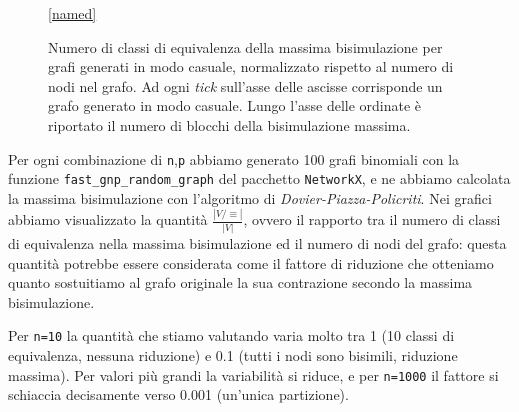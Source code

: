 \begin{figure}[t!]
\begin{center}
\begin{subfigure}[b]{0.3\textwidth}
        \end{subfigure}
        \ref*{named}
    \end{center}
    \caption{Numero di classi di equivalenza della massima bisimulazione per grafi generati in modo casuale, normalizzato rispetto al numero di nodi nel grafo. Ad ogni \emph{tick} sull'asse delle ascisse corrisponde un grafo generato in modo casuale. Lungo l'asse delle ordinate è riportato il numero di blocchi della bisimulazione massima.}
    \label{fig:bisi_size}
\end{figure}

Per ogni combinazione di \verb|n|,\verb|p| abbiamo generato 100 grafi binomiali con la funzione \verb|fast_gnp_random_graph| del pacchetto \texttt{NetworkX}, e ne abbiamo calcolata la massima bisimulazione con l'algoritmo di \emph{Dovier-Piazza-Policriti}. Nei grafici abbiamo visualizzato la quantità $\frac{|V / \equiv|}{|V|}$, ovvero il rapporto tra il numero di classi di equivalenza nella massima bisimulazione ed il numero di nodi del grafo: questa quantità potrebbe essere considerata come il fattore di riduzione che otteniamo quanto sostuitiamo al grafo originale la sua contrazione secondo la massima bisimulazione.

Per \verb|n=10| la quantità che stiamo valutando varia molto tra 1 (10 classi di equivalenza, nessuna riduzione) e 0.1 (tutti i nodi sono bisimili, riduzione massima). Per valori più grandi la variabilità si riduce, e per \verb|n=1000| il fattore si schiaccia decisamente verso 0.001 (un'unica partizione).
